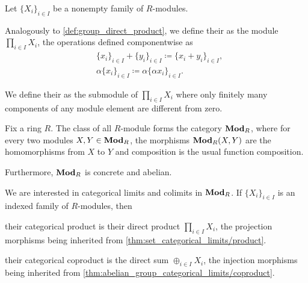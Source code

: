 \begin{definition}\label{def:module_direct_product}
  Let \( \{ X_i \}_{i \in I} \) be a nonempty family of \( R \)-modules.

  Analogously to \cref{def:group_direct_product}, we define their  as the module \( \prod_{i \in I} X_i \), the operations defined componentwise as
  \begin{align*}
    &\{ x_i \}_{i \in I} + \{ y_i \}_{i \in I}
    \coloneqq
    \{ x_i + y_i \}_{i \in I}, \\
    &\alpha \{ x_i \}_{i \in I}
    \coloneqq
    \alpha \{ \alpha x_i \}_{i \in I}.
  \end{align*}

  We define their  as the submodule of \( \prod_{i \in I} X_i \) where only finitely many components of any module element are different from zero.
\end{definition}

\begin{definition}\label{def:category_of_modules}
  Fix a ring \( R \). The class of all \( R \)-module forms the category \( \operatorname{\mathbf{Mod}}_R \), where for every two modules \( X, Y \in \operatorname{\mathbf{Mod}}_R \), the morphisms \( \operatorname{\mathbf{Mod}}_R(X, Y) \) are the homomorphisms from \( X \) to \( Y \) and composition is the usual function composition.

  Furthermore, \( \operatorname{\mathbf{Mod}}_R \) is concrete and abelian.
\end{definition}

\begin{proposition}\label{thm:module_categorical_limits}
  We are interested in categorical limits and colimits in \( \operatorname{\mathbf{Mod}}_R \). If \( \{ X_i \}_{i \in I} \) is an indexed family of \( R \)-modules, then
  \begin{defenum}
    \item\label{thm:module_categorical_limits/product} their categorical product is their direct product \( \prod_{i \in I} X_i \), the projection morphisms being inherited from \cref{thm:set_categorical_limits/product}.

    \item\label{thm:module_categorical_limits/coproduct} their categorical coproduct is the direct sum \( \oplus_{i \in I} X_i \), the injection morphisms being inherited from \cref{thm:abelian_group_categorical_limits/coproduct}.
  \end{defenum}
\end{proposition}

